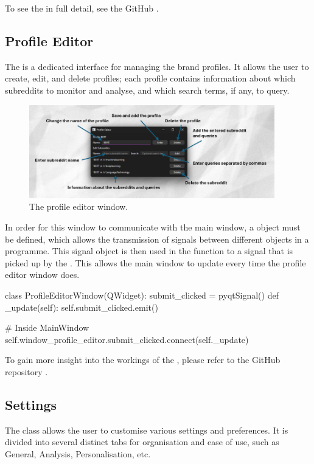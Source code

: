     To see the  in full detail, see the GitHub \citep{sentimentanalysistool}.

    \subsection{Profile Editor}
    The  is a dedicated interface for managing the brand profiles. It allows the user to create, edit, and delete profiles; each profile contains information about which subreddits to monitor and analyse, and which search terms, if any, to query.

    \begin{figure}[h]
        \centering
            \includegraphics[width=0.95\textwidth]{figures/profile-editor-window-labels.png}
        \caption{The profile editor window.}
    \end{figure}

    In order for this window to communicate with the main window, a  object must be defined, which allows the transmission of signals between different objects in a programme. This signal object is then used in the  function to  a signal that is picked up by the . This allows the main window to update every time the profile editor window does.

    \begin{python}
class ProfileEditorWindow(QWidget):
    submit_clicked = pyqtSignal()
    def _update(self):
        self.submit_clicked.emit()

# Inside MainWindow
self.window_profile_editor.submit_clicked.connect(self._update)
    \end{python}

    To gain more insight into the workings of the , please refer to the GitHub repository \citep{sentimentanalysistool}.

    \subsection{Settings}
    The  class allows the user to customise various settings and preferences. It is divided into several distinct tabs for organisation and ease of use, such as General, Analysis, Personalisation, etc.

